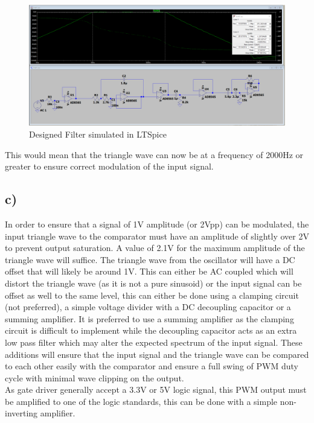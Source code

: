 \documentclass[]{article}
\begin{document}
	\begin{figure}[H]
		\centering
		\includegraphics[width=1\linewidth]{screenshot001}
		\caption{Designed Filter simulated in LTSpice}
		\label{fig:screenshot001}
	\end{figure}
\begin{multicols}{2}
	This would mean that the triangle wave can now be at a frequency of 2000Hz or greater to ensure correct modulation of the input signal.
	\subsection{c)}
	In order to ensure that a signal of 1V amplitude (or 2Vpp) can be modulated, the input triangle wave to the comparator must have an amplitude of slightly over 2V to prevent output saturation. A value of 2.1V for the maximum amplitude of the triangle wave will suffice. 
	The triangle wave from the oscillator will have a DC offset that will likely be around 1V. This can either be AC coupled which will distort the triangle wave (as it is not a pure sinusoid) or the input signal can be offset as well to the same level, this can either be done using a clamping circuit (not preferred), a simple voltage divider with a DC decoupling capacitor or a summing amplifier. It is preferred to use a summing amplifier as the clamping circuit is difficult to implement while the decoupling capacitor acts as an extra low pass filter which may alter the expected spectrum of the input signal.
	These additions will ensure that the input signal and the triangle wave can be compared to each other easily with the comparator and ensure a full swing of PWM duty cycle with minimal wave clipping on the output.\\
	As gate driver generally accept a 3.3V or 5V logic signal, this PWM output must be amplified to one of the logic standards, this can be done with a simple non-inverting amplifier.
\end{multicols}
\end{document}
